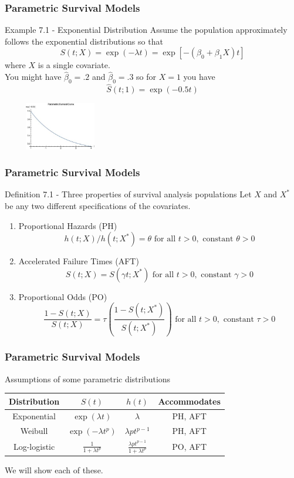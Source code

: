 \documentclass{beamer}
\theoremstyle{definition}
\begin{document}
\begin{frame}
\frametitle{Parametric Survival Models}
\begin{block}{Example 7.1 - Exponential Distribution}
Assume the population approximately follows the exponential distributions so that
\[
S(t;X) = \exp(-\lambda t) = \exp[-(\beta_0 + \beta_1 X)t]
\]
where $X$ is a single covariate. \\

You might have $\hat{\beta}_0=.2$ and $\hat{\beta}_0=.3$ so for $X=1$ you have
\[
\hat{S}(t;1) = \exp(-0.5 t)
\]
\begin{center}
        \includegraphics[width=5cm, height=2.1cm]{CH7_ex1.JPG}
    \end{center}
\end{block}
\end{frame}





 
 \begin{frame}
\frametitle{Parametric Survival Models}
\begin{block}{Definition 7.1 - Three properties of survival analysis populations}
Let $X$ and $X^*$ be any two different specifications of the covariates.
\begin{enumerate}
\item Proportional Hazards (PH)
\[ h(t;X)/h(t;X^*) = \theta \text{ for all } t>0, \text{ constant } \theta > 0 \]
\item Accelerated Failure Times (AFT)
\[ S(t;X) =  S(\gamma t;X^*)  \text{ for all } t>0, \text{ constant } \gamma > 0
\]
\item Proportional Odds (PO)
\[ \frac{1- S(t;X)}{S(t;X)} = \tau \left(\frac{1- S(t;X^*)}{S(t;X^*)}\right)  \text{ for all } t>0, \text{ constant } \tau > 0
\]
\end{enumerate}
\end{block}
\end{frame}

\begin{frame}
\frametitle{Parametric Survival Models}
\begin{block}{Assumptions of some parametric distributions }
\begin{center}
\begin{tabular}{ c c c | c }
Distribution & $S(t)$ & $h(t)$ & Accommodates \\ \hline
Exponential & $\exp(\lambda t)$ & $\lambda$ & PH, AFT \\
Weibull  & $\exp(-\lambda t^p)$ & $\lambda p t^{p-1}$ & PH, AFT\\
Log-logistic & $\frac{1}{1+\lambda t^p}$ & $ \frac{\lambda p t^{p-1}}{1+\lambda t^p}$ & PO, AFT
\end{tabular}
\end{center}
\end{block}
We will show each of these. 
\end{frame}
 
\end{document}
